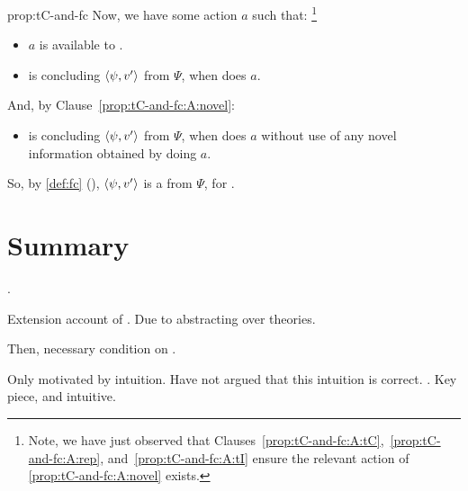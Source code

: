 \begin{note}
\begin{argument}{prop:tC-and-fc}
    \noindent%
    Now, we have some action \(a\) such that:%
    \footnote{
      Note, we have just observed that Clauses~\ref{prop:tC-and-fc:A:tC},~\ref{prop:tC-and-fc:A:rep}, and~\ref{prop:tC-and-fc:A:tI} ensure the relevant action of  \ref{prop:tC-and-fc:A:novel} exists.
    }

    \begin{itemize}[noitemsep]
    \item
      \(a\) is available to \vAgent{}.
    \item
      \vAgent{} is concluding \(\langle \psi, v' \rangle\) from \(\Psi\), when \vAgent{} does \(a\).
    \end{itemize}

    \noindent%
    And, by Clause~\ref{prop:tC-and-fc:A:novel}:

    \begin{itemize}[noitemsep]
    \item
      \vAgent{} is concluding \(\langle \psi, v' \rangle\) from \(\Psi\), when \vAgent{} does \(a\) without use of any novel information obtained by doing \(a\).
    \end{itemize}

    \noindent%
    So, by \autoref{def:fc} (), \(\langle \psi, v' \rangle\) is a \emph{} from \(\Psi\), for \vAgent{}.
  \end{argument}
\end{note}



\section*{Summary}

\begin{note}
  .

  Extension account of \torN{}.
  Due to abstracting over theories.

  Then, necessary condition on \tC{}.
\end{note}

\begin{note}
  Only motivated \tC{} by intuition.
  Have not argued that this intuition is correct.
  .
  Key piece, and intuitive.
\end{note}




